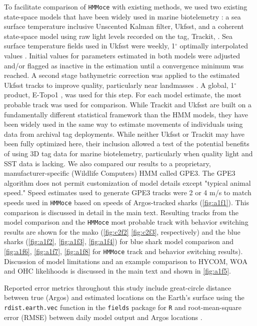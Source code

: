 To facilitate comparison of \texttt{HMMoce} with existing methods, we used two existing state-space models that have been widely used in marine biotelemetry \citep[\eg][]{Braun2015a, Galuardi2012, Lam2014, Lam2016, Thorrold2014, Winship2012}: a sea surface temperature inclusive Unscented Kalman filter, Ukfsst, \citep{Lam2008, Nielsen2007} and a coherent state-space model using raw light levels recorded on the tag, Trackit, \citep{Nielsen2007}. Sea surface temperature fields used in Ukfsst were weekly, 1$^{\circ}$ optimally interpolated values \citep{Reynolds2002}. Initial values for parameters estimated in both models were adjusted and/or flagged as inactive in the estimation until a convergence minimum was reached. A second stage bathymetric correction was applied to the estimated Ukfsst tracks to improve quality, particularly near landmasses \citep{Galuardi2010}. A global, 1$^\circ$ product, E-Topo1 \citep{Amante2009}, was used for this step. For each model estimate, the most probable track was used for comparison. While Trackit and Ukfsst are built on a fundamentally different statistical framework than the HMM models, they have been widely used in the same way to estimate movements of individuals using data from archival tag deployments. While neither Ukfsst or Trackit may have been fully optimized here, their inclusion allowed a test of the potential benefits of using 3D tag data for marine biotelemetry, particularly when quality light and SST data is lacking. We also compared our results to a proprietary, manufacturer-specific (Wildlife Computers) HMM called GPE3. The GPE3 algorithm does not permit customization of model details except "typical animal speed." Speed estimates used to generate GPE3 tracks were 2 or 4 m/s to match speeds used in \texttt{HMMoce} based on speeds of Argos-tracked sharks (\cref{fig:a1f1}). This comparison is discussed in detail in the main text. Resulting tracks from the model comparison and the \texttt{HMMoce} most probable track with behavior switching results are shown for the mako (\cref{fig:c2f2} \cref{fig:c2f3}, respectively) and the blue sharks (\cref{fig:a1f2}, \cref{fig:a1f3}, \cref{fig:a1f4}) for blue shark model comparison and \cref{fig:a1f6}, \cref{fig:a1f7}, \cref{fig:a1f8} for \texttt{HMMoce} track and behavior switching results). Discussion of model limitations and an example comparison to HYCOM, WOA and OHC likelihoods is discussed in the main text and shown in \cref{fig:a1f5}.

Reported error metrics throughout this study include great-circle distance between true (Argos) and estimated locations on the Earth's surface using the \texttt{rdist.earth.vec} function in the \texttt{fields} \citep{Nychka2015} package for \texttt{R} and root-mean-square error (RMSE) between daily model output and Argos locations \citep{Galuardi2008, Wilson2007, Braun2015a}.

